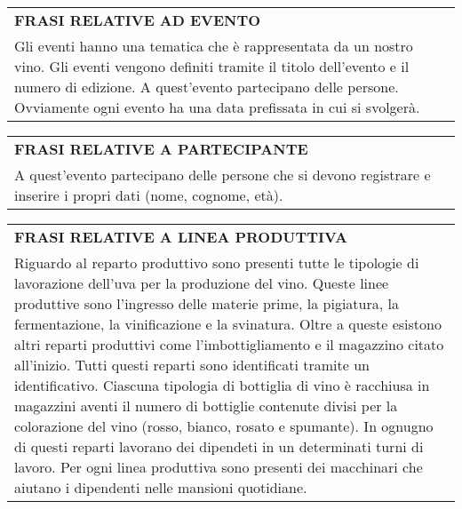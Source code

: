 \begin{center}
	\vspace{0.5cm}
	
	\begin{tabular}{P{16cm}}
		\toprule
		 \textbf {\large {FRASI RELATIVE AD EVENTO}} \\
		Gli eventi hanno una tematica che è rappresentata da un nostro vino. Gli eventi vengono definiti tramite il titolo dell'evento e il numero di edizione. A quest'evento partecipano delle persone. Ovviamente ogni evento ha una data prefissata in cui si svolgerà.\\
		\bottomrule
	\end{tabular}
	
	\vspace{0.5cm}
	
	\begin{tabular}{P{16cm}}
		\toprule
		 \textbf {\large {FRASI RELATIVE A PARTECIPANTE}} \\
		A quest'evento partecipano delle persone che si devono registrare e inserire i propri dati (nome, cognome, età).\\
		\bottomrule
	\end{tabular}
	
	\vspace{0.5cm}
	
	\begin{tabular}{P{16cm}}
		\toprule
		 \textbf {\large {FRASI RELATIVE A LINEA PRODUTTIVA}} \\
		Riguardo al reparto produttivo sono presenti tutte le tipologie di lavorazione dell'uva per la produzione del vino. Queste linee produttive sono l'ingresso delle materie prime, la pigiatura, la fermentazione, la vinificazione e la svinatura. Oltre a queste esistono altri reparti produttivi come l'imbottigliamento e il magazzino citato all'inizio. Tutti questi reparti sono identificati tramite un identificativo. Ciascuna tipologia di bottiglia di vino è racchiusa in magazzini aventi il numero di bottiglie contenute divisi per la colorazione del vino (rosso, bianco, rosato e spumante). In ognugno di questi reparti lavorano dei dipendeti in un determinati turni di lavoro. Per ogni linea produttiva sono presenti dei macchinari che aiutano i dipendenti nelle mansioni quotidiane.\\
		\bottomrule
	\end{tabular}
	
	\vspace{0.5cm}
	

\end{center}
